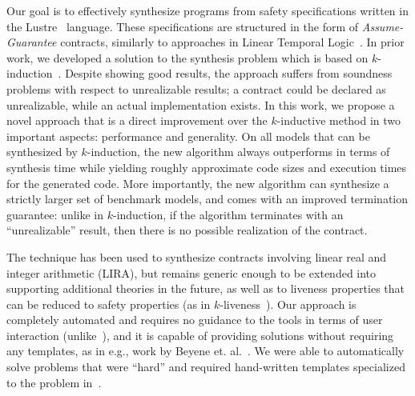 Our goal is to effectively synthesize programs from safety specifications written in the Lustre~\cite{lustrev6} language.  These specifications are structured in the form of {\em
Assume-Guarantee} contracts, similarly to approaches in Linear Temporal Logic~\cite{ringert2017synthesis}. In prior work, we developed a solution to the synthesis problem which is based on $k$-induction~\cite{gacek2015towards,katis2016towards,KatisFGBGW16}.
Despite showing good results, the approach suffers from soundness problems with respect to unrealizable results; a contract could be declared as unrealizable, while an actual implementation exists.
In this work, we propose a novel approach that is a direct improvement over the $k$-inductive method in two important aspects: performance and generality.  On all models that can be synthesized
by $k$-induction, the new algorithm always outperforms in terms of synthesis time while yielding roughly approximate code sizes and execution times for the generated code. More importantly, the new algorithm can synthesize a strictly larger set of benchmark models,
and comes with an improved termination guarantee: unlike in $k$-induction, if the algorithm terminates with an ``unrealizable'' result, then there is no possible realization of the contract.

The technique has been used to synthesize contracts involving linear real and integer arithmetic (LIRA),
but remains generic enough to be extended into supporting additional theories
in the future, as well as to liveness properties that can be reduced to safety properties (as in $k$-liveness~\cite{claessen2012liveness}).  Our approach is completely automated and requires no guidance to the tools in terms of user interaction (unlike~\cite{ryzhyk2014user,ryzhyk2016developing}), and it is capable of providing solutions without requiring any templates, as in e.g., work by Beyene et. al.~\cite{beyene2014constraint}.  We were able to automatically solve problems that were ``hard'' and required hand-written templates specialized to the problem in~\cite{beyene2014constraint}.


